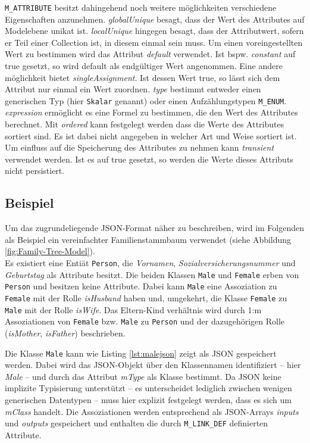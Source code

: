 \texttt{M\_ATTRIBUTE} besitzt dahingehend noch weitere m\"oglichkeiten verschiedene Eigenschaften anzunehmen. \textit{globalUnique} besagt, dass der Wert des Attributes auf Modelebene unikat ist. \textit{localUnique} hingegen besagt, dass der Attributwert, sofern er Teil einer Collection ist, in diesem einmal sein muss. Um einen voreingestellten Wert zu bestimmen wird das Attribut \textit{default} verwendet. Ist bspw. \textit{constant} auf true gesetzt, so wird default als endg\"ultiger Wert angenommen. Eine andere m\"oglichkeit bietet \textit{singleAssignment}. Ist dessen Wert true, so lässt sich dem Attribut nur einmal ein Wert zuordnen. \textit{type} bestimmt entweder einen generischen Typ (hier \texttt{Skalar} genannt) oder einen Aufz\"ahlungstypen \texttt{M\_ENUM}. \textit{expression} erm\"oglicht es eine Formel zu bestimmen, die den Wert des Attributes berechnet. Mit \textit{ordered} kann festgelegt werden dass die Werte des Attributes sortiert sind. Es ist dabei nicht angegeben in welcher Art und Weise sortiert ist. Um einfluss auf die Speicherung des Attributes zu nehmen kann \textit{transient} verwendet werden. Ist es auf true gesetzt, so werden die Werte dieses Attributs nicht persistiert. 


\subsection{Beispiel}
Um das zugrundeliegende JSON-Format n\"aher zu beschreiben, wird im Folgenden als Beispiel ein vereinfachter Familienstammbaum verwendet (siehe Abbildung \ref{fig:Family-Tree-Model}).\\ 
Es existiert eine Entiät \texttt{Person}, die \textit{Vornamen}, \textit{Sozialversicherungsnummer} und \textit{Geburtstag} als Attribute besitzt. Die beiden Klassen \texttt{Male} und \texttt{Female} erben von \texttt{Person} und besitzen keine Attribute. Dabei kann \texttt{Male} eine Assoziation zu \texttt{Female} mit der Rolle \textit{isHusband} haben und, umgekehrt, die Klasse \texttt{Female} zu \texttt{Male} mit der Rolle \textit{isWife}. Das Eltern-Kind verh\"altnis wird durch 1:m Assoziationen von \texttt{Female} bzw. \texttt{Male} zu \texttt{Person} und der dazugeh\"origen Rolle (\textit{isMother}, \textit{isFather}) beschrieben.



Die Klasse \texttt{Male} kann wie Listing \ref{lst:malejson} zeigt als JSON gespeichert werden. Dabei wird das JSON-Objekt \"uber den Klassennamen identifiziert -- hier \textit{Male} -- und durch das Attribut \textit{mType} als Klasse bestimmt. Da JSON keine implizite Typisierung unterstützt -- es unterscheidet lediglich zwischen wenigen generischen Datentypen -- muss hier explizit festgelegt werden, dass es sich um \textit{mClass} handelt. Die Assoziationen werden entsprechend als JSON-Arrays \textit{inputs} und \textit{outputs} gespeichert und enthalten die durch \texttt{M\_LINK\_DEF} definierten Attribute.

